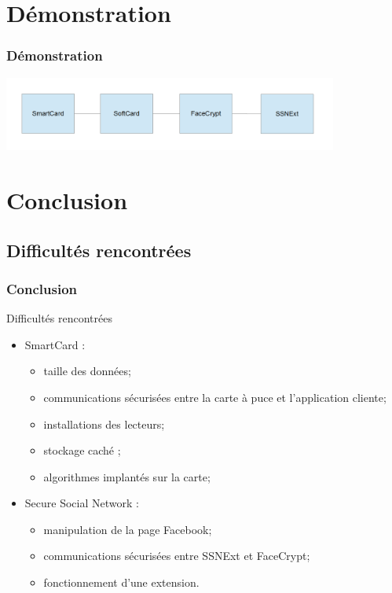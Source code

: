 \documentclass{beamer}
\begin{document}
\section{Démonstration}
\begin{frame}
    \frametitle{Démonstration}
    \begin{center}
    \includegraphics[width=11cm]{all.png}
    \end{center}
\end{frame}

\section{Conclusion}
\subsection{Difficultés rencontrées}
\begin{frame}
    \frametitle{Conclusion}
    \begin{alertblock}{Difficultés rencontrées}
        \begin{itemize}
            \item SmartCard : 
                \begin{itemize}
                    \item taille des données; %
                    \item communications sécurisées entre la carte à puce et l'application
                        cliente;
                    \item installations des lecteurs;
                    \item stockage \og caché \fg{}; %
                    \item algorithmes implantés sur la carte;
                \end{itemize}
            \item Secure Social Network : 
                \begin{itemize}
                    \item manipulation de la page Facebook;
                    \item communications sécurisées entre SSNExt et FaceCrypt;
                    \item fonctionnement d'une extension.
                \end{itemize}
        \end{itemize}
    \end{alertblock}
\end{frame}
\end{document}

